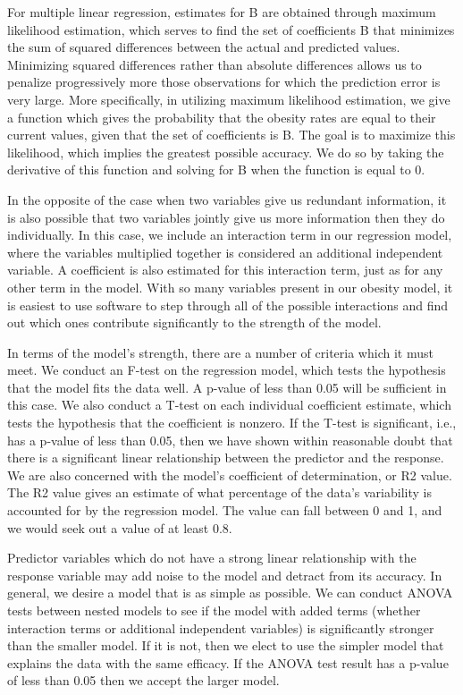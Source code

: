 \documentclass[oneside,12pt]{report}
\begin{document}
For multiple linear regression, estimates for B are obtained through maximum likelihood estimation, which serves to find the set of coefficients B that minimizes the sum of squared differences between the actual and predicted values. Minimizing squared differences rather than absolute differences allows us to penalize progressively more those observations for which the prediction error is very large. More specifically, in utilizing maximum likelihood estimation, we give a function which gives the probability that the obesity rates are equal to their current values, given that the set of coefficients is B. The goal is to maximize this likelihood, which implies the greatest possible accuracy. We do so by taking the derivative of this function and solving for B when the function is equal to 0.

In the opposite of the case when two variables give us redundant information, it is also possible that two variables jointly give us more information then they do individually. In this case, we include an interaction term in our regression model, where the variables multiplied together is considered an additional independent variable. A coefficient is also estimated for this interaction term, just as for any other term in the model. With so many variables present in our obesity model, it is easiest to use software to step through all of the possible interactions and find out which ones contribute significantly to the strength of the model.

In terms of the model's strength, there are a number of criteria which it must meet. We conduct an F-test on the regression model, which tests the hypothesis that the model fits the data well. A p-value of less than 0.05 will be sufficient in this case. We also conduct a T-test on each individual coefficient estimate, which tests the hypothesis that the coefficient is nonzero. If the T-test is significant, i.e., has a p-value of less than 0.05, then we have shown within reasonable doubt that there is a significant linear relationship between the predictor and the response. We are also concerned with the model's coefficient of determination, or R2 value. The R2 value gives an estimate of what percentage of the data's variability is accounted for by the regression model. The value can fall between 0 and 1, and we would seek out a value of at least 0.8.

Predictor variables which do not have a strong linear relationship with the response variable may add noise to the model and detract from its accuracy. In general, we desire a model that is as simple as possible. We can conduct ANOVA tests between nested models to see if the model with added terms (whether interaction terms or additional independent variables) is significantly stronger than the smaller model. If it is not, then we elect to use the simpler model that explains the data with the same efficacy. If the ANOVA test result has a p-value of less than 0.05 then we accept the larger model.
\end{document}
